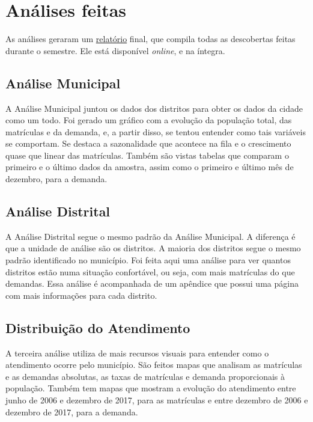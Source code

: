 \documentclass[12pt, a4paper]{article}
\begin{document}
\section{Análises feitas}

As análises geraram um \href{https://lsflp.github.io/MAC0213/relatorios/relatorio.pdf}{relatório} final, que compila todas as descobertas feitas durante o semestre. Ele está disponível \textit{online}, e na íntegra.

\subsection{Análise Municipal}

A Análise Municipal juntou os dados dos distritos para obter os dados da cidade como um todo. Foi gerado um gráfico com a evolução da população total, das matrículas e da demanda, e, a partir disso, se tentou entender como tais variáveis se comportam. Se destaca a sazonalidade que acontece na fila e o crescimento quase que linear das matrículas. Também são vistas tabelas que comparam o primeiro e o último dados da amostra, assim como o primeiro e último mês de dezembro, para a demanda.

\subsection{Análise Distrital}

A Análise Distrital segue o mesmo padrão da Análise Municipal. A diferença é que a unidade de análise são os distritos. A maioria dos distritos segue o mesmo padrão identificado no município. Foi feita aqui uma análise para ver quantos distritos estão numa situação confortável, ou seja, com mais matrículas do que demandas. Essa análise é acompanhada de um apêndice que possui uma página com mais informações para cada distrito.

\subsection{Distribuição do Atendimento}

A terceira análise utiliza de mais recursos visuais para entender como o atendimento ocorre pelo município. São feitos mapas que analisam as matrículas e as demandas absolutas, as taxas de matrículas e demanda proporcionais à população. Também tem mapas que mostram a evolução do atendimento entre junho de 2006 e dezembro de 2017, para as matrículas e entre dezembro de 2006 e dezembro de 2017, para a demanda.
\end{document}
